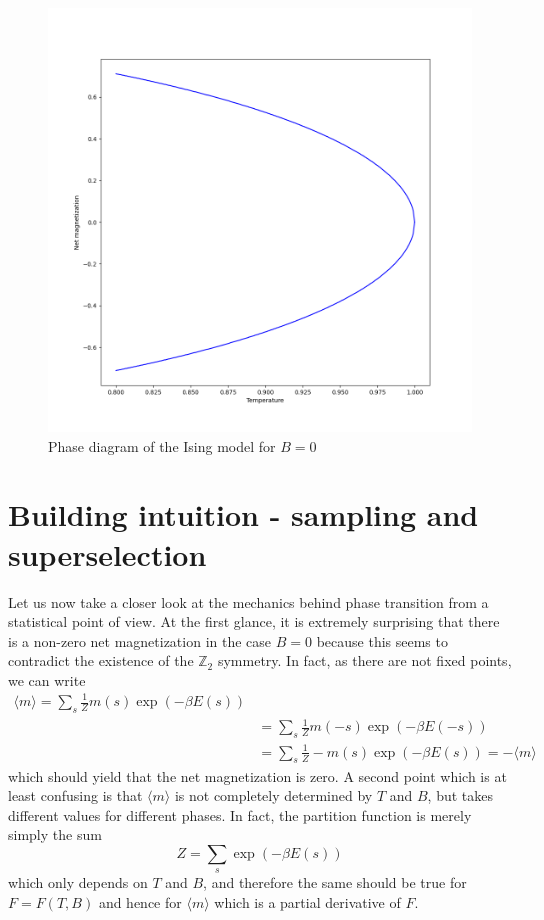 \documentclass[a4paper, draft]{article}
\theoremstyle{own}
\theoremstyle{remark}
\newcommand{\Z}{\mathbb{Z}}
\begin{document}
\begin{figure}[ht]
	\centering
	\includegraphics[scale=.5]{IsingModelCriticalTemperature	}
	\caption{Phase diagram of the Ising model for $B = 0$}
	\label{fig:IsingModelCritical}
\end{figure}


\section{Building intuition - sampling and superselection}

Let us now take a closer look at the mechanics behind phase transition from a statistical point of view. At the first glance, it is extremely surprising that there is a non-zero net magnetization in the case $B = 0$ because this seems to contradict the existence of the $\Z_2$ symmetry. In fact, as there are not fixed points, we can write
\begin{align*}
\langle m \rangle = \sum_{s} \frac{1}{Z} m(s) \exp(-\beta E(s)) \\
&= \sum_{s} \frac{1}{Z} m(-s) \exp(-\beta E(-s)) \\ 
&= \sum_{s} \frac{1}{Z} - m(s) \exp(-\beta E(s)) = - \langle m \rangle
\end{align*}
which should yield that the net magnetization is zero.  A second point which is at least confusing is that $\langle m \rangle $ is not completely determined by $T$ and $B$, but takes different values for different phases. In fact, the partition function is merely simply the sum
$$
Z = \sum_s \exp(-\beta E(s))
$$
which only depends on $T$ and $B$, and therefore the same should be true for $F = F(T, B)$ and hence for $\langle m \rangle$ which is a partial derivative of $F$.
\end{document}
